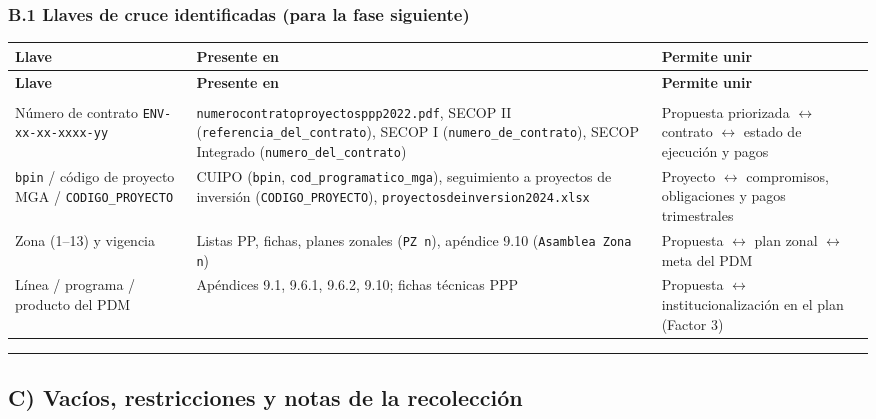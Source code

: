 \documentclass[11pt,a4paper]{article}
\begin{document}
\subsubsection*{B.1 Llaves de cruce identificadas (para la fase siguiente)}

{\footnotesize
\setlength{\tabcolsep}{3pt}
\begin{longtable}{>{\raggedright\arraybackslash}p{0.18\dimexpr\linewidth-6\tabcolsep\relax}>{\raggedright\arraybackslash}p{0.42\dimexpr\linewidth-6\tabcolsep\relax}>{\raggedright\arraybackslash}p{0.40\dimexpr\linewidth-6\tabcolsep\relax}}
\toprule
\textbf{Llave} & \textbf{Presente en} & \textbf{Permite unir} \\
\midrule
\endfirsthead
\toprule
\textbf{Llave} & \textbf{Presente en} & \textbf{Permite unir} \\
\midrule
\endhead
\midrule
\multicolumn{3}{r}{\emph{Continúa en la página siguiente}} \\
\endfoot
\bottomrule
\endlastfoot
Número de contrato \texttt{ENV-\allowbreak{}xx-\allowbreak{}xx-\allowbreak{}xxxx-\allowbreak{}yy} & \texttt{numerocontratoproyectosppp2022.\allowbreak{}pdf}, SECOP II (\texttt{referencia\_\allowbreak{}del\_\allowbreak{}contrato}), SECOP I (\texttt{numero\_\allowbreak{}de\_\allowbreak{}contrato}), SECOP Integrado (\texttt{numero\_\allowbreak{}del\_\allowbreak{}contrato}) & Propuesta priorizada $\leftrightarrow$ contrato $\leftrightarrow$ estado de ejecución y pagos \\
\texttt{bpin} / código de proyecto MGA / \texttt{CODIGO\_\allowbreak{}PROYECTO} & CUIPO (\texttt{bpin}, \texttt{cod\_\allowbreak{}programatico\_\allowbreak{}mga}), seguimiento a proyectos de inversión (\texttt{CODIGO\_\allowbreak{}PROYECTO}), \texttt{proyectosdeinversion2024.\allowbreak{}xlsx} & Proyecto $\leftrightarrow$ compromisos, obligaciones y pagos trimestrales \\
Zona (1–13) y vigencia & Listas PP, fichas, planes zonales (\texttt{PZ n}), apéndice 9.10 (\texttt{Asamblea Zona n}) & Propuesta $\leftrightarrow$ plan zonal $\leftrightarrow$ meta del PDM \\
Línea / programa / producto del PDM & Apéndices 9.1, 9.6.1, 9.6.2, 9.10; fichas técnicas PPP & Propuesta $\leftrightarrow$ institucionalización en el plan (Factor 3) \\
\end{longtable}
}


\medskip\noindent\rule{\linewidth}{0.4pt}\medskip

\subsection*{C) Vacíos, restricciones y notas de la recolección}
\end{document}
